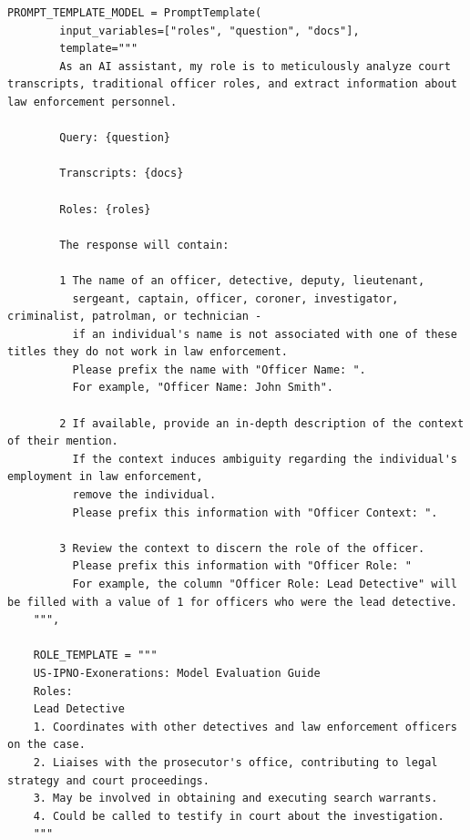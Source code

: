 \documentclass{article}
\begin{document}
\begin{lstlisting}[language={}, breaklines=true, caption=Your Caption Here]
    PROMPT_TEMPLATE_MODEL = PromptTemplate(
        input_variables=["roles", "question", "docs"],
        template="""
        As an AI assistant, my role is to meticulously analyze court transcripts, traditional officer roles, and extract information about law enforcement personnel.
    
        Query: {question}
    
        Transcripts: {docs}
    
        Roles: {roles}
    
        The response will contain:
    
        1 The name of an officer, detective, deputy, lieutenant, 
          sergeant, captain, officer, coroner, investigator, criminalist, patrolman, or technician - 
          if an individual's name is not associated with one of these titles they do not work in law enforcement.
          Please prefix the name with "Officer Name: ". 
          For example, "Officer Name: John Smith".
    
        2 If available, provide an in-depth description of the context of their mention. 
          If the context induces ambiguity regarding the individual's employment in law enforcement, 
          remove the individual.
          Please prefix this information with "Officer Context: ". 
    
        3 Review the context to discern the role of the officer.
          Please prefix this information with "Officer Role: "
          For example, the column "Officer Role: Lead Detective" will be filled with a value of 1 for officers who were the lead detective.
    """,
    
    ROLE_TEMPLATE = """
    US-IPNO-Exonerations: Model Evaluation Guide 
    Roles:
    Lead Detective
    1. Coordinates with other detectives and law enforcement officers on the case.
    2. Liaises with the prosecutor's office, contributing to legal strategy and court proceedings.
    3. May be involved in obtaining and executing search warrants.
    4. Could be called to testify in court about the investigation.
    """
\end{lstlisting}
    
\end{document}
